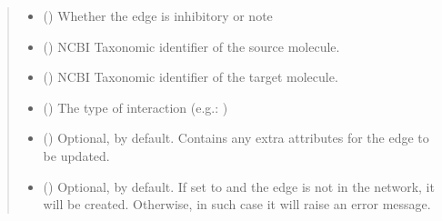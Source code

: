 \documentclass[letterpaper,10pt,english]{sphinxmanual}
\begin{document}
\begin{fulllineitems}
\begin{fulllineitems}
\begin{quote}
\begin{description}
\begin{itemize}
\item {} 
 () \textendash{} Whether the edge is inhibitory or note

\item {} 
 () \textendash{} NCBI Taxonomic identifier of the source molecule.

\item {} 
 () \textendash{} NCBI Taxonomic identifier of the target molecule.

\item {} 
 () \textendash{} The type of interaction (e.g.: )

\item {} 
 () \textendash{} Optional, \sphinxcode{\sphinxupquote{\{\}}} by default. Contains any extra attributes
for the edge to be updated.

\item {} 
 () \textendash{} Optional,  by default. If set to  and the
edge is not in the network, it will be created. Otherwise,
in such case it will raise an error message.

\end{itemize}

\end{description}\end{quote}

\end{fulllineitems}



\end{fulllineitems}
\end{document}
